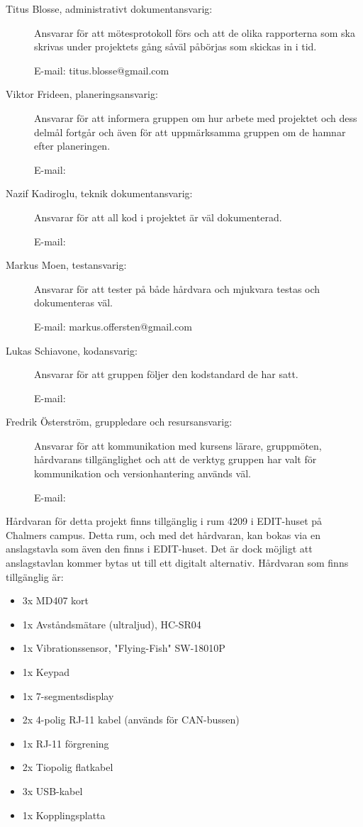 \documentclass{article}
\begin{document}
\begin{description}
    \item[Titus Blosse, administrativt dokumentansvarig:] Ansvarar för att mötesprotokoll förs och att de olika rapporterna som ska skrivas under projektets gång såväl påbörjas som skickas in i tid.
    
    E-mail: titus.blosse@gmail.com
    
    \item[Viktor Frideen, planeringsansvarig:] Ansvarar för att informera gruppen om hur arbete med projektet och dess delmål fortgår och även för att uppmärksamma gruppen om de hamnar efter planeringen.
    
    E-mail: 
    
    \item[Nazif Kadiroglu, teknik dokumentansvarig:] Ansvarar för att all kod i projektet är väl dokumenterad.
    
    E-mail: 
    
    \item[Markus Moen, testansvarig:] Ansvarar för att tester på både hårdvara och mjukvara testas och dokumenteras väl.
    
    E-mail: markus.offersten@gmail.com
    
    \item[Lukas Schiavone, kodansvarig:] Ansvarar för att gruppen följer den kodstandard de har satt.
    
    E-mail: 
    
    \item[Fredrik Österström, gruppledare och resursansvarig:] Ansvarar för att kommunikation med kursens lärare, gruppmöten, hårdvarans tillgänglighet och att de verktyg gruppen har valt för kommunikation och versionhantering används väl.
    
    E-mail: 
\end{description}

Hårdvaran för detta projekt finns tillgänglig i rum 4209 i EDIT-huset på Chalmers campus. Detta rum, och med det hårdvaran, kan bokas via en anslagstavla som även den finns i EDIT-huset. Det är dock möjligt att anslagstavlan kommer bytas ut till ett digitalt alternativ. Hårdvaran som finns tillgänglig är: 

\begin{itemize}
    \item 3x MD407 kort
    \item 1x Avståndsmätare (ultraljud), HC-SR04
    \item 1x Vibrationssensor, "Flying-Fish" SW-18010P
    \item 1x Keypad
    \item 1x 7-segmentsdisplay
    \item 2x 4-polig RJ-11 kabel (används för CAN-bussen)
    \item 1x RJ-11 förgrening
    \item 2x Tiopolig flatkabel
    \item 3x USB-kabel
    \item 1x Kopplingsplatta
\end{itemize}
\end{document}
